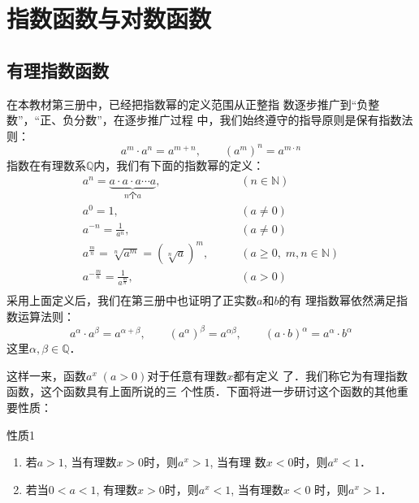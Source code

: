 \chapter{指数函数与对数函数}
\section{有理指数函数}
在本教材第三册中，已经把指数幂的定义范围从正整指
数逐步推广到“负整数”，“正、负分数”，在逐步推广过程
中，我们始终遵守的指导原则是保有指数法则：
\[a^m\cdot a^n=a^{m+n},\qquad  (a^m)^n=a^{m\cdot n}\]
指数在有理数系$\mathbb{Q}$内，我们有下面的指数幂的定义：
\[\begin{split}
  a^n=\underbrace{a\cdot a\cdot a\cdots a}_{\text{$n$个$a$}},&\qquad (n\in\mathbb{N})\\  
a^0=1,&\qquad (a\ne 0)\\  
a^{-n}=\frac{1}{a^n},&\qquad (a\ne 0)\\ 
a^{\tfrac{m}{n}}=\sqrt[n]{a^m}=\left(\sqrt[n]{a}\right)^m,&\qquad (a\ge 0,\; m,n\in\mathbb{N})\\ 
a^{-\tfrac{m}{n}}=\frac{1}{a^{\tfrac{m}{n}}},&\qquad (a> 0)\\ 
\end{split}\]
采用上面定义后，我们在第三册中也证明了正实数$a$和$b$的有
理指数幂依然满足指数运算法则：
\[a^{\alpha}\cdot a^{\beta}=a^{\alpha+\beta},\qquad (a^{\alpha})^{\beta}=a^{\alpha\beta},\qquad (a\cdot b)^{\alpha}=a^{\alpha}\cdot b^{\alpha}\]
这里$\alpha,\beta \in \mathbb{Q}$．

这样一来，函数$a^x\; (a>0)$对于任意有理数$x$都有定义
了．我们称它为有理指数函数，这个函数具有上面所说的三
个性质．下面将进一步研讨这个函数的其他重要性质：

\begin{blk}{性质1}
\begin{enumerate}
    \item 若$a>1$, 当有理数$x>0$时，则$a^x>1$, 当有理
    数$x<0$时，则$a^x<1$．
    \item 若当$0<a<1$, 有理数$x>0$时，则$a^x<1$, 当有理数$x<0$
    时，则$a^x>1$．
\end{enumerate}
\end{blk}

